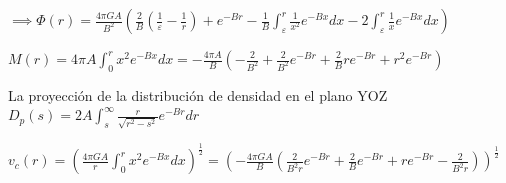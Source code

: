 \documentclass[12pt]{book}
\begin{document}
\begin{description}
\item $\implies \Phi(r) = \frac{4 \pi G A}{B^2}(\frac{2}{B}(\frac{1}{\varepsilon} - \frac{1}{r}) + e^{-Br} - \frac{1}{B}\int_\varepsilon^r{\frac{1}{x^2}e^{-Bx}dx} - 2\int_\varepsilon^r{\frac{1}{x} e^{-Bx}dx} ) $


\item $M(r) = 4 \pi A \int_0^r{x^2 e^{-Bx}dx} = -\frac{4 \pi A}{B}( -\frac{2}{B^2} + \frac{2}{B^2}e^{-Br} +\frac{2}{B}r e^{-Br} + r^2 e^{-Br}) $
\item La proyección de la distribución de densidad en el plano YOZ
$D_p(s) = 2 A \int_s^\infty{\frac{r}{\sqrt{r^2-s^2}} e^{-Br} dr}$

\item $v_c(r) = (\frac{4 \pi G A}{r}\int_0^r{x^2 e^{-Bx}dx} )^{\frac{1}{2}}   
= (-\frac{4 \pi G A}{B}(\frac{2}{B^2r}e^{-Br} +\frac{2}{B} e^{-Br} + r e^{-Br} -  \frac{2}{B^2r} ))^{\frac{1}{2}} $

\end{description}
\end{document}
